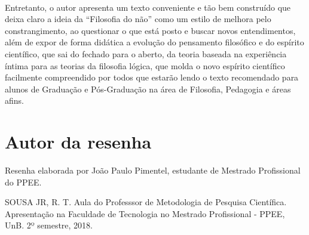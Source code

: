 \documentclass[11pt]{article}
\begin{document}
\paragraph{}
    Entretanto, o autor apresenta um texto conveniente e tão bem construído que deixa claro a ideia da “Filosofia do não” como um estilo de melhora pelo constrangimento, ao questionar o que está posto e buscar novos entendimentos, além de expor de forma didática a evolução do pensamento filosófico e do espírito científico, que sai do fechado para o aberto, da teoria baseada na experiência íntima para as teorias da filosofia lógica, que molda o novo espírito científico facilmente compreendido por todos que estarão lendo o texto recomendado para alunos de Graduação e Pós-Graduação na área de Filosofia, Pedagogia e áreas afins.

\section{Autor da resenha}
Resenha elaborada por João Paulo Pimentel, estudante de Mestrado Profissional do PPEE. 




	SOUSA JR, R. T. Aula do Professsor de Metodologia de Pesquisa Científica. Apresentação na Faculdade de Tecnologia no Mestrado Profissional - PPEE, UnB. 2º semestre, 2018.  
\end{document}
